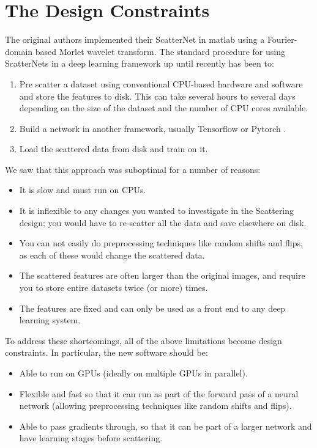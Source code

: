 \section{The Design Constraints}
The original authors implemented their ScatterNet in matlab \cite{oyallon_deep_2015} using
a Fourier-domain based Morlet wavelet transform. 
The standard procedure for using ScatterNets in a deep learning
framework up until recently has been to:
\begin{enumerate}
  \item Pre scatter a dataset using conventional CPU-based hardware and software
    and store the features to disk. This can take several hours to several days
    depending on the size of the dataset and the number of CPU cores available.
  \item Build a network in another framework, usually Tensorflow \cite{abadi_tensorflow:_2015}
    or Pytorch \cite{paszke_automatic_2017}.
  \item Load the scattered data from disk and train on it.
\end{enumerate} 
We saw that this approach was suboptimal for a number of reasons:
\begin{itemize}
  \item It is slow and must run on CPUs.
  \item It is inflexible to any changes you wanted to investigate in the
    Scattering design; you would have to re-scatter all the data and save
    elsewhere on disk.
  \item You can not easily do preprocessing techniques like random shifts and
    flips, as each of these would change the scattered data.
  \item The scattered features are often larger than the original images, and 
    require you to store entire datasets twice (or more) times.
  \item The features are fixed and can only be used as a front end to any
    deep learning system.
\end{itemize}

To address these shortcomings, all of the above limitations become design
constraints. In particular, the new software should be:
\begin{itemize}
  \item Able to run on GPUs (ideally on multiple GPUs in parallel).
  \item Flexible and fast so that it can run as part of the forward pass of
    a neural network (allowing preprocessing techniques like random shifts and
    flips).
  \item Able to pass gradients through, so that it can be part of a larger
    network and have learning stages before scattering.
\end{itemize}

